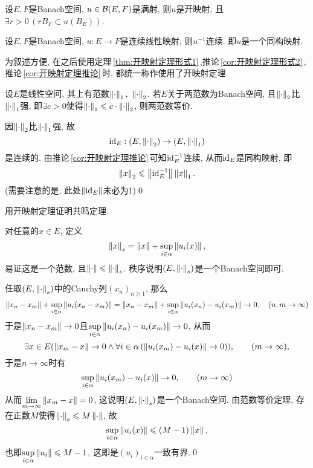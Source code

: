 	\begin{Corollary}[开映射定理]\label{cor:开映射定理形式2}
	设$ E, F $是Banach空间, $ u\in\mathcal{B}(E,F) $是满射, 则$ u $是开映射, 且$ \exists r>0\,(rB_F\subset u(B_E)) $.
	\end{Corollary}
	
	\begin{Corollary}\label{cor:开映射定理推论}
	设$ E, F $是Banach空间, $ u: E\to F $是连续线性映射, 则$ u^{-1} $连续. 即$ u $是一个同构映射.
	\end{Corollary}
	
	为叙述方便, 在之后使用定理\,\ref{thm:开映射定理形式1}\,,推论\,\ref{cor:开映射定理形式2}\,,推论\,\ref{cor:开映射定理推论}\,时, 都统一称作使用了开映射定理.
	
	\begin{Corollary}[范数等价定理]
	设$ E $是线性空间, 其上有范数$ \norm{\cdot}_1,\ \norm{\cdot}_2 $. 若$ E $关于两范数为Banach空间, 且$ \left\| \cdot \right\|_2 $比$ \left\| \cdot \right\|_1 $强, 即$ \exists c>0 $使得$ \left\| \cdot \right\|_1\leqslant c\cdot\left\| \cdot \right\|_2 $, 则两范数等价.
	\end{Corollary}
	\begin{Proof}
	因$ \left\| \cdot \right\|_2 $比$ \left\| \cdot \right\|_1 $强, 故
	\[
	\mathrm{id}_E : (E,\left\| \cdot \right\|_2)\to(E,\left\| \cdot \right\|_1)
	\]
	是连续的. 由推论\,\ref{cor:开映射定理推论}\,可知$ \mathrm{id}_E^{-1} $连续, 从而$ \mathrm{id}_E $是同构映射, 即
	\[
	\left\| x \right\|_2\leqslant\left\| \mathrm{id}_E^{-1} \right\|\left\| x \right\|_1.
	\]
	(需要注意的是, 此处$ \left\| \mathrm{id}_E \right\| $未必为1)\qed
	\end{Proof}
	
	\begin{Example}
	用开映射定理证明共鸣定理.
	\end{Example}
	\begin{Proof}
	对任意的$ x\in E $, 定义
	\[
	\left\| x \right\|_s=\left\| x \right\|+\sup_{i\in\alpha}\left\| u_i(x) \right\|,
	\]
	易证这是一个范数, 且$ \left\| \cdot \right\|\leqslant\left\| \cdot \right\|_s $. 秩序说明$ (E,\left\| \cdot \right\|_s) $是一个Banach空间即可.
	
	任取$ (E,\left\| \cdot \right\|_s) $中的Cauchy列$ (x_n)_{n\geqslant 1} $, 那么
	\[
	\left\| x_n-x_m \right\|+\sup_{i\in\alpha}\left\| u_i(x_n-x_m) \right\|=\left\| x_n-x_m \right\|+\sup_{i\in\alpha}\left\| u_i(x_n)-u_i(x_m) \right\|\to 0,\quad (n,m\to\infty)
	\]
	于是$ \left\| x_n-x_m \right\|\to 0 $且$ \sup\limits_{i\in\alpha}\left\| u_i(x_n)-u_i(x_m) \right\|\to 0 $, 从而
	\[
	\exists x\in E(\left\| x_m-x \right\|\to 0\land\forall i\in\alpha\,(\left\| u_i(x_m)-u_i(x) \right\|\to 0)),\qquad (m\to\infty),
	\]
	于是$ n\to \infty $时有
	\[
	\sup_{i\in\alpha}\left\| u_i(x_m)-u_i(x) \right\|\to 0,\qquad (m\to\infty)
	\]
	从而$ \lim\limits_{m\to\infty}\left\| x_m-x \right\|=0 $, 这说明$ (E,\left\| \cdot \right\|_s) $是一个Banach空间. 由范数等价定理, 存在正数$ M $使得$ \left\| \cdot \right\|_s\leqslant M\left\| \cdot \right\| $, 故
	\[
	\sup_{i\in\alpha}\left\| u_i(x) \right\|\leqslant (M-1)\left\| x \right\|,
	\]
	也即$ \sup\limits_{i\in\alpha}\left\| u_i \right\|\leqslant M-1 $, 这即是$ (u_i)_{i\in\alpha} $一致有界.\qed
	\end{Proof}
	
